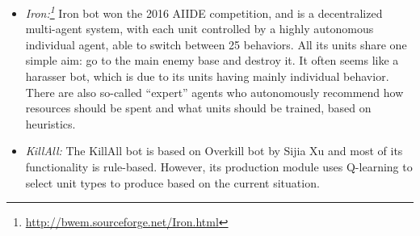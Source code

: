 \begin{itemize}
  
  \item {\em Iron:\footnote{\url{http://bwem.sourceforge.net/Iron.html}}} Iron bot won the 2016 AIIDE competition, and is a decentralized multi-agent system, with each unit controlled by a highly autonomous individual agent, able to switch between 25 behaviors. All its units share one simple aim: go to the main enemy base and destroy it. It often seems like a harasser bot, which is due to its units having mainly individual behavior. There are also so-called ``expert'' agents who autonomously recommend how resources should be spent and what units should be trained, based on heuristics. 
  
  
  \item {\em KillAll:} The KillAll bot is based on Overkill bot by Sijia Xu and most of its functionality is rule-based. However, its production module uses Q-learning to select unit types to produce based on the current situation. 
    

\end{itemize}
